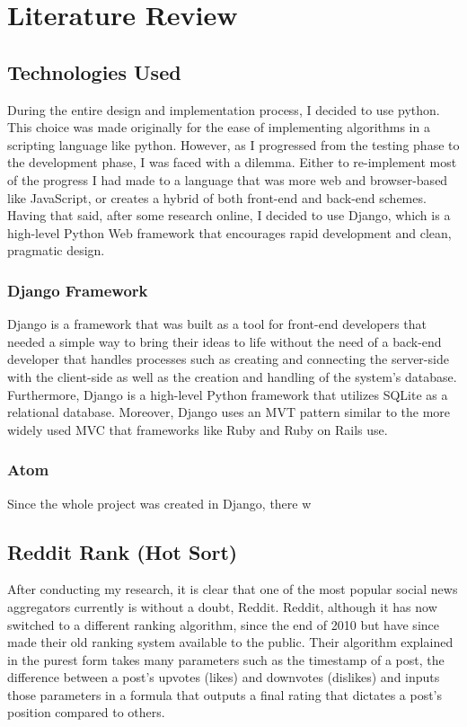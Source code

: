 
\chapter{Literature Review}

\section {Technologies Used}
During the entire design and implementation process, I decided to use python. This choice was made originally for the ease of implementing algorithms in a scripting language like python. However, as I progressed from the testing phase to the development phase, I was faced with a dilemma. Either to re-implement most of the progress I had made to a language that was more web and browser-based like JavaScript, or creates a hybrid of both front-end and back-end schemes. Having that said, after some research online, I decided to use Django, which is a high-level Python Web framework that encourages rapid development and clean, pragmatic design.

\subsection{Django Framework}
Django is a framework that was built as a tool for front-end developers that needed a simple way to bring their ideas to life without the need of a back-end developer that handles processes such as creating and connecting the server-side with the client-side as well as the creation and handling of the system's database. Furthermore, Django is a high-level Python framework that utilizes SQLite as a relational database. Moreover, Django uses an MVT pattern similar to the more widely used MVC that frameworks like Ruby and Ruby on Rails use.

\subsection {Atom}
Since the whole project was created in Django, there w

\section {Reddit Rank (Hot Sort)}
After conducting my research, it is clear that one of the most popular social news aggregators currently is without a doubt, Reddit. Reddit, although it has now switched to a different ranking algorithm, since the end of 2010 but have since made their old ranking system available to the public. Their algorithm explained in the purest form takes many parameters such as the timestamp of a post, the difference between a post’s upvotes (likes) and downvotes (dislikes) and inputs those parameters in a formula that outputs a final rating that dictates a post’s position compared to others.

